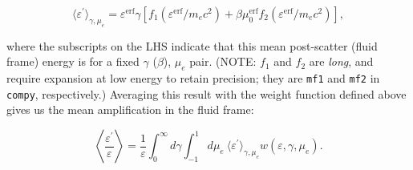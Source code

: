 \documentclass[letterpaper]{article}
\begin{document}
\begin{equation}
\langle \varepsilon^\prime \rangle_{\gamma, \mu_e} = \varepsilon^\mathrm{erf} \gamma \left[ f_1 \left( \varepsilon^\mathrm{erf} / m_e c^2 \right) + \beta \mu_0^\mathrm{erf} f_2 \left( \varepsilon^\mathrm{erf} / m_e c^2 \right) \right],
\end{equation}

\noindent where the subscripts on the LHS indicate that this mean post-scatter (fluid frame) energy is for a fixed $\gamma$ ($\beta$), $\mu_e$ pair. (NOTE: $f_1$ and $f_2$ are \emph{long}, and require expansion at low energy to retain precision; they are \texttt{mf1} and \texttt{mf2} in \texttt{compy}, respectively.) Averaging this result with the weight function defined above gives us the mean amplification in the fluid frame:

\begin{equation}
\left\langle \frac{ \varepsilon^\prime }{ \varepsilon } \right\rangle = \frac{1}{\varepsilon} \int_0^\infty d\gamma \int_{-1}^1 d\mu_e\ \langle \varepsilon^\prime \rangle_{\gamma, \mu_e} w\left(\varepsilon, \gamma, \mu_e\right).
\end{equation}
\end{document}
